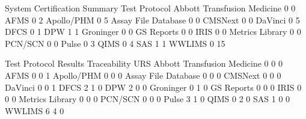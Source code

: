 \documentclass{article}
\begin{document}
\begin{Schunk}
\begin{Soutput}
                              System Certification Summary Test Protocol
  Abbott Transfusion Medicine                            0             0
  AFMS                                                   0             2
  Apollo/PHM                                             0             5
  Assay File Database                                    0             0
  CMSNext                                                0             0
  DaVinci                                                0             5
  DFCS                                                   0             1
  DPW                                                    1             1
  Groninger                                              0             0
  GS Reports                                             0             0
  IRIS                                                   0             0
  Metrics Library                                        0             0
  PCN/SCN                                                0             0
  Pulse                                                  0             3
  QIMS                                                   0             4
  SAS                                                    1             1
  WWLIMS                                                 0            15
                             
                              Test Protocol Results Traceability URS
  Abbott Transfusion Medicine                     0            0   0
  AFMS                                            0            0   1
  Apollo/PHM                                      0            0   0
  Assay File Database                             0            0   0
  CMSNext                                         0            0   0
  DaVinci                                         0            0   1
  DFCS                                            2            1   0
  DPW                                             2            0   0
  Groninger                                       0            1   0
  GS Reports                                      0            0   0
  IRIS                                            0            0   0
  Metrics Library                                 0            0   0
  PCN/SCN                                         0            0   0
  Pulse                                           3            1   0
  QIMS                                            0            2   0
  SAS                                             1            0   0
  WWLIMS                                          6            4   0
                             

\end{Soutput}
\end{Schunk}
\end{document}
